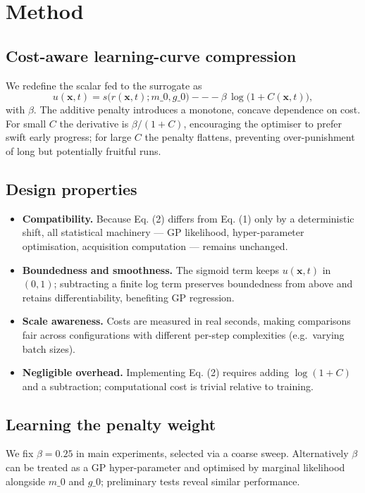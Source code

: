 \documentclass{article} %
\begin{document}
\section{Method}\label{sec:method}

\subsection{Cost-aware learning-curve compression}
We redefine the scalar fed to the surrogate as
\begin{equation}\tag{2}
  u(\mathbf{x}, t) = s\big(r(\mathbf{x}, t); m\_0, g\_0\big) --- \beta\,\log\!\big(1 + C(\mathbf{x}, t)\big),
\end{equation}
with \(\beta\). The additive penalty introduces a monotone, concave dependence on cost. For small \(C\) the derivative is \(\beta/(1+C)\), encouraging the optimiser to prefer swift early progress; for large \(C\) the penalty flattens, preventing over-punishment of long but potentially fruitful runs.

\subsection{Design properties}
\begin{itemize}
  \item \textbf{Compatibility.} Because Eq. (2) differs from Eq. (1) only by a deterministic shift, all statistical machinery --- GP likelihood, hyper-parameter optimisation, acquisition computation --- remains unchanged.
  \item \textbf{Boundedness and smoothness.} The sigmoid term keeps \(u(\mathbf{x}, t)\) in \((0,1)\); subtracting a finite log term preserves boundedness from above and retains differentiability, benefiting GP regression.
  \item \textbf{Scale awareness.} Costs are measured in real seconds, making comparisons fair across configurations with different per-step complexities (e.g.\@\ varying batch sizes).
  \item \textbf{Negligible overhead.} Implementing Eq. (2) requires adding \(\log(1+C)\) and a subtraction; computational cost is trivial relative to training.
\end{itemize}

\subsection{Learning the penalty weight}
We fix \(\beta = 0.25\) in main experiments, selected via a coarse sweep. Alternatively \(\beta\) can be treated as a GP hyper-parameter and optimised by marginal likelihood alongside \(m\_0\) and \(g\_0\); preliminary tests reveal similar performance.
\end{document}
